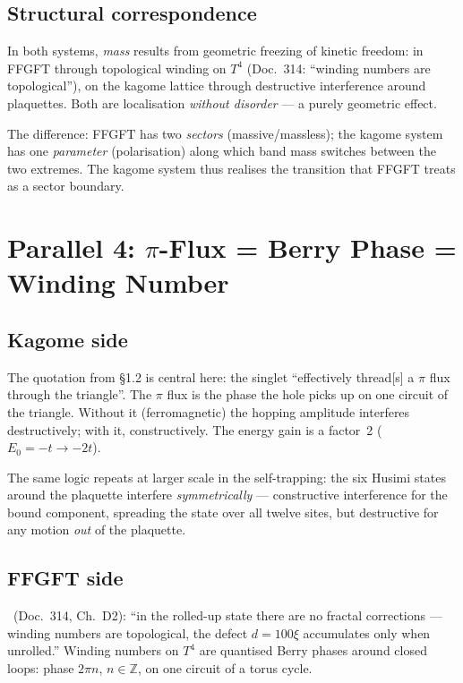 \subsection{Structural correspondence}

In both systems, \emph{mass} results from geometric freezing of kinetic
freedom: in FFGFT through topological winding on $T^4$ (Doc.~314: ``winding
numbers are topological''), on the kagome lattice through destructive
interference around plaquettes. Both are localisation \emph{without
disorder} --- a purely geometric effect. \SM

The difference: FFGFT has two \emph{sectors} (massive/massless); the kagome
system has one \emph{parameter} (polarisation) along which band mass switches
between the two extremes. The kagome system thus realises the transition
that FFGFT treats as a sector boundary.

\section{Parallel 4: $\pi$-Flux = Berry Phase = Winding Number}

\subsection{Kagome side}

The quotation from §1.2 is central here: the singlet ``effectively
thread[s] a $\pi$ flux through the triangle''. The $\pi$ flux is the phase
the hole picks up on one circuit of the triangle. Without it (ferromagnetic)
the hopping amplitude interferes destructively; with it, constructively.
The energy gain is a factor~2 ($E_0=-t\to-2t$).

The same logic repeats at larger scale in the self-trapping: the six Husimi
states around the plaquette interfere \emph{symmetrically} --- constructive
interference for the bound component, spreading the state over all twelve
sites, but destructive for any motion \emph{out} of the plaquette.

\subsection{FFGFT side}

\BM\ (Doc.~314, Ch.~D2): ``in the rolled-up state there are no fractal
corrections --- winding numbers are topological, the defect $d=100\xi$
accumulates only when unrolled.'' Winding numbers on $T^4$ are quantised
Berry phases around closed loops: phase $2\pi n$, $n\in\mathbb{Z}$, on one
circuit of a torus cycle.

